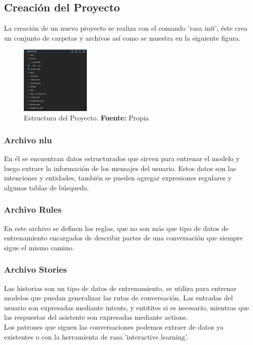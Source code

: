 \subsection{Creación del Proyecto}
La creación de un nuevo proyecto se realiza con el comando ’rasa init’, éste crea
un conjunto de carpetas y archivos así como se muestra en la siguiente figura.
\begin{figure}[H]
\begin{centering}
\includegraphics[angle=0,width=0.3\textwidth]{Figuras/4_Estructura del Proyecto.png}
\par \end{centering}
\caption[Estructura del Proyecto]{Estructura del Proyecto. \textbf{Fuente:} Propia}
\label{Estructura}
\end{figure}
\subsubsection{Archivo nlu}
En él se encuentran datos estructurados que sirven para entrenar el modelo y luego extraer la información de los mensajes del usuario. Estos datos son  las intenciones y entidades, también se pueden agregar expresiones regulares y algunas tablas de búsqueda. \cite{NLU_Documentation}
\subsubsection{Archivo Rules}
En este archivo se definen las reglas, que no son más que  tipo de datos de entrenamiento encargados de describir partes de una conversación que siempre sigue el mismo camino.\cite{Rules_Documentation}
\subsubsection{Archivo Stories}
Las historias son un tipo de datos de entrenamiento, se utiliza para entrenar modelos que puedan generalizar las rutas de conversación. Las entradas del usuario son expresadas mediante intents, y entitites si es necesario,  mientras que las respuestas del asistente son expresadas mediante actions.\\
Los patrones que siguen las conversaciones podemos extraer de datos ya existentes o con la herramienta de rasa 'interactive learning'. \cite{Stories_Documentation}

